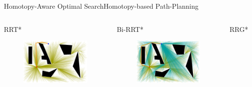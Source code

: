 \begin{frame}{Homotopy-Aware Optimal Search}{Homotopy-based Path-Planning}

\begin{columns}

\begin{block}{RRT*}
\begin{figure}
	\centering
	\includegraphics[width=\linewidth]{figure/single_tree}
\end{figure}
\end{block}
\begin{block}{Bi-RRT*}
\begin{figure}
	\centering
	\includegraphics[width=\linewidth]{figure/bi_tree}
\end{figure}
\end{block}
\begin{block}{RRG*}

\end{block}
\end{columns}
\end{frame}
